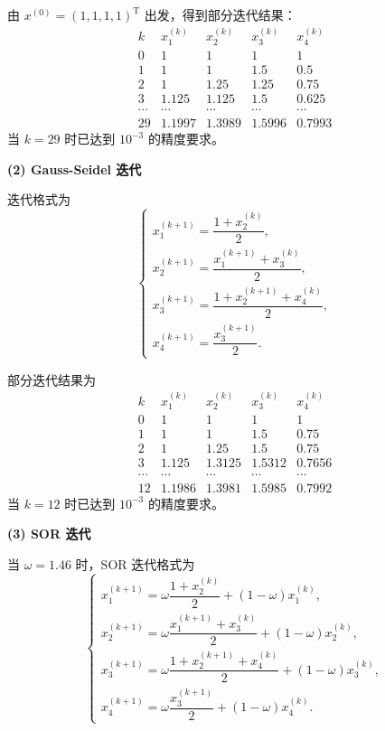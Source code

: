 \documentclass[11pt, a4paper]{ctexart}
\begin{document}
\begin{solution}
    由 $x^{(0)} = (1,1,1,1)^{\mathrm{T}}$ 出发，得到部分迭代结果：
    \[
        \renewcommand{\arraystretch}{1.15}
        \begin{array}{c|cccc}
            k & x_1^{(k)} & x_2^{(k)} & x_3^{(k)} & x_4^{(k)} \\ \hline
            0  & 1      & 1      & 1      & 1 \\
            1  & 1      & 1      & 1.5    & 0.5 \\
            2  & 1      & 1.25   & 1.25   & 0.75 \\
            3  & 1.125  & 1.125  & 1.5    & 0.625 \\
            \cdots & \cdots & \cdots & \cdots & \cdots \\
            29 & 1.1997 & 1.3989 & 1.5996 & 0.7993
        \end{array}
    \]
    当 $k = 29$ 时已达到 $10^{-3}$ 的精度要求。

    \textbf{(2) Gauss-Seidel 迭代}

    迭代格式为
    \[
        \begin{cases}
            x_1^{(k+1)} = \dfrac{1 + x_2^{(k)}}{2}, \\
            x_2^{(k+1)} = \dfrac{x_1^{(k+1)} + x_3^{(k)}}{2}, \\
            x_3^{(k+1)} = \dfrac{1 + x_2^{(k+1)} + x_4^{(k)}}{2}, \\
            x_4^{(k+1)} = \dfrac{x_3^{(k+1)}}{2}.
        \end{cases}
    \]

    部分迭代结果为
    \[
        \renewcommand{\arraystretch}{1.15}
        \begin{array}{c|cccc}
            k & x_1^{(k)} & x_2^{(k)} & x_3^{(k)} & x_4^{(k)} \\ \hline
            0  & 1      & 1      & 1      & 1 \\
            1  & 1      & 1      & 1.5    & 0.75 \\
            2  & 1      & 1.25   & 1.5    & 0.75 \\
            3  & 1.125  & 1.3125 & 1.5312 & 0.7656 \\
            \cdots & \cdots & \cdots & \cdots & \cdots \\
            12 & 1.1986 & 1.3981 & 1.5985 & 0.7992
        \end{array}
    \]
    当 $k = 12$ 时已达到 $10^{-3}$ 的精度要求。

    \textbf{(3) SOR 迭代}

    当 $\omega = 1.46$ 时，SOR 迭代格式为
    \[
        \begin{cases}
            x_1^{(k+1)}
            = \omega \dfrac{1 + x_2^{(k)}}{2} + (1 - \omega)x_1^{(k)}, \\
            x_2^{(k+1)}
            = \omega \dfrac{x_1^{(k+1)} + x_3^{(k)}}{2} + (1 - \omega)x_2^{(k)}, \\
            x_3^{(k+1)}
            = \omega \dfrac{1 + x_2^{(k+1)} + x_4^{(k)}}{2} + (1 - \omega)x_3^{(k)}, \\
            x_4^{(k+1)}
            = \omega \dfrac{x_3^{(k+1)}}{2} + (1 - \omega)x_4^{(k)}.
        \end{cases}
    \]


\end{solution}
\end{document}
